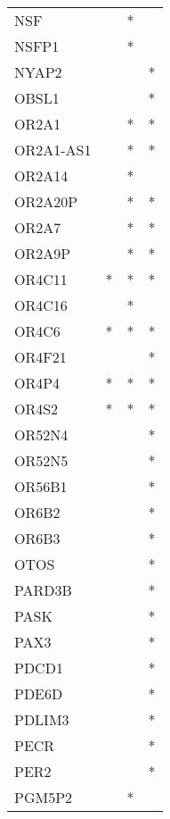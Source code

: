 \begin{longtable}{lccc}
NSF            &           &   * &         \\
NSFP1          &           &   * &         \\
NYAP2          &           &     &       * \\
OBSL1          &           &     &       * \\
OR2A1          &           &   * &       * \\
OR2A1-AS1      &           &   * &       * \\
OR2A14         &           &   * &         \\
OR2A20P        &           &   * &       * \\
OR2A7          &           &   * &       * \\
OR2A9P         &           &   * &       * \\
OR4C11         &         * &   * &       * \\
OR4C16         &           &   * &         \\
OR4C6          &         * &   * &       * \\
OR4F21         &           &     &       * \\
OR4P4          &         * &   * &       * \\
OR4S2          &         * &   * &       * \\
OR52N4         &           &     &       * \\
OR52N5         &           &     &       * \\
OR56B1         &           &     &       * \\
OR6B2          &           &     &       * \\
OR6B3          &           &     &       * \\
OTOS           &           &     &       * \\
PARD3B         &           &     &       * \\
PASK           &           &     &       * \\
PAX3           &           &     &       * \\
PDCD1          &           &     &       * \\
PDE6D          &           &     &       * \\
PDLIM3         &           &     &       * \\
PECR           &           &     &       * \\
PER2           &           &     &       * \\
PGM5P2         &           &   * &         \\

\end{longtable}
